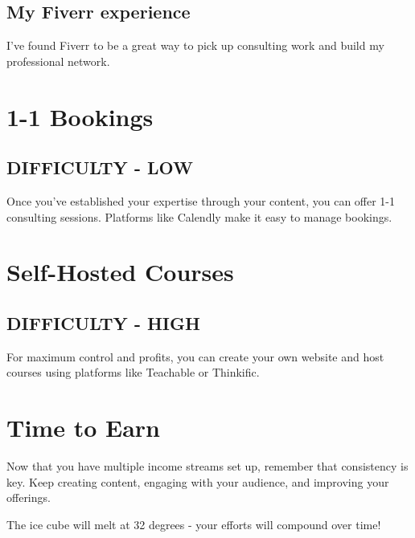 \documentclass[11pt]{article}
\begin{document}
\subsection*{My Fiverr experience}
I've found Fiverr to be a great way to pick up consulting work and build my professional network.

\section*{1-1 Bookings}
\subsection*{DIFFICULTY - LOW}
Once you've established your expertise through your content, you can offer 1-1 consulting sessions. Platforms like Calendly make it easy to manage bookings.

\section*{Self-Hosted Courses}
\subsection*{DIFFICULTY - HIGH}
For maximum control and profits, you can create your own website and host courses using platforms like Teachable or Thinkific.

\section*{Time to Earn}
Now that you have multiple income streams set up, remember that consistency is key. Keep creating content, engaging with your audience, and improving your offerings.

The ice cube will melt at 32 degrees - your efforts will compound over time!
\end{document}
